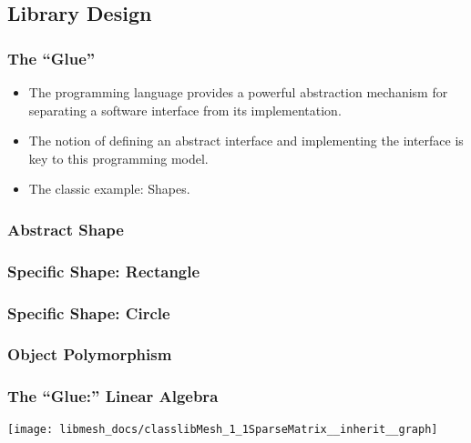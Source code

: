 \subsection{Library Design}
\frame
{
  \frametitle{The ``Glue''}
  \begin{itemize}
    \item The \cpp{} programming language provides a powerful abstraction mechanism for separating a software interface from its implementation.
    \item The notion of  defining an abstract interface and  implementing the interface is key to this programming model.
      \pause
    \item The classic \cpp{} example: Shapes.
  \end{itemize}
  
}



\frame
{
  \frametitle{Abstract Shape}
  
}



\frame
{
  \frametitle{Specific Shape: Rectangle}
  
}



\frame
{
  \frametitle{Specific Shape: Circle}
  
}



\frame
{
  \frametitle{Object Polymorphism}
  
}



\frame
{
  \Large
  \begin{block}{}
    \center{\bf \libmesh{}}
  \end{block}
}



\frame
{
  \frametitle{The ``Glue:'' Linear Algebra}
  \begin{center}
    \texttt{[image: libmesh\_docs/classlibMesh\_1\_1SparseMatrix\_\_inherit\_\_graph]}
  \end{center}
}



